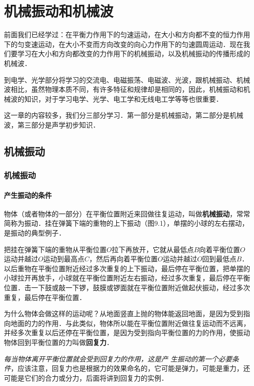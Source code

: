 


\chapter{机械振动和机械波}
前面我们已经学过：在平衡力作用下的匀速运动，在大小和方向都不变的恒力作用下的匀变速运动，在大小不变而方向改变的向心力作用下的匀速圆周运动．现在我们要学习在大小和方向都改变的力作用下的机械振动，以及机械振动的传播形成的机械波．

到电学、光学部分将学习的交流电、电磁振荡、电磁波、光波，跟机械振动、机械波相比，虽然物理本质不同，有许多特征和规律却是相同的，因此，机械振动和机械波的知识，对于学习电学、光学、电工学和无线电工学等等也很重要．

这一章的内容较多，我们分三部分学习．第一部分是机械振动，第二部分是机械波，第三部分是声学初步知识．


\section{机械振动}
\subsection{机械振动}

\subsubsection{产生振动的条件} 

物体（或者物体的一部分）在平衡位置附近来回做往复运动，叫做\textbf{机械振动}，常常简称为振动．挂在弹簧下端的重物的上下振动（图9.1），单摆的小球的左右摆动，是振动的典型例子．

把挂在弹簧下端的重物从平衡位置$O$拉下再放开，它就从最低点$B$向着平衡位置$O$运动并越过$O$运动到最高点$C$，然后再向着平衡位置$O$运动并越过$O$回到最低点$B$．以后重物在平衡位置附近经过多次重复的上下振动，最后停在平衡位置，把单摆的小球拉开再放手，小球就在平衡位置附近左右振动，经过多次重复，最后停在平衡位置．击一下鼓或敲一下锣，鼓膜或锣面就在平衡位置附近做起伏振动，经过多次重复，最后停在平衡位置．

为什么物体会做这样的运动呢？从地面竖直上抛的物体能返回地面，是因为受到指向地面的力的作用．与此类似，物体所以能在平衡位置附近做往复运动而不远离，并经多次重复以后还停在平衡位置，是因为受到指向平衡位置的力的作用，使振动物体回到平衡位置的力叫做\textbf{回复力}．

\textit{每当物体离开平衡位置就会受到回复力的作用，这是产
生振动的第一个必要条件}，应该注意，回复力也是根据力的效果命名的，它可能是弹力，可能是重力，还可能是它们的合力或分力，后面将讲到回复力的实例．

